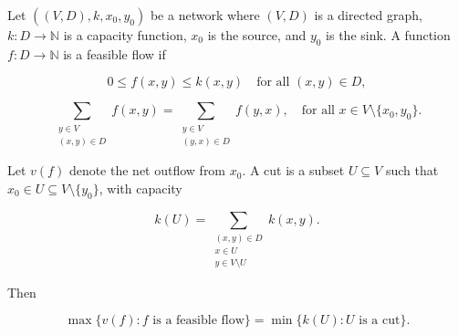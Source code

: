 Let $((V, D), k, x_0, y_0)$ be a network where $(V, D)$ is a directed graph, $k: D \to \mathbb{N}$ is a capacity function, $x_0$ is the source, and $y_0$ is the sink. A function $f: D \to \mathbb{N}$ is a feasible flow if

$$0 \leq f(x, y) \leq k(x, y) \quad \text{for all } (x, y) \in D,$$

$$\sum_{\substack{y \in V \\ (x, y) \in D}} f(x, y) = \sum_{\substack{y \in V \\ (y, x) \in D}} f(y, x), \quad \text{for all } x \in V \setminus \{x_0, y_0\}.$$

Let $v(f)$ denote the net outflow from $x_0$. A cut is a subset $U \subseteq V$ such that $x_0 \in U \subseteq V \setminus \{y_0\}$, with capacity

$$k(U) = \sum_{\substack{(x, y) \in D \\ x \in U \\ y \in V \setminus U}} k(x, y).$$

Then

$$\max\{v(f): f \text{ is a feasible flow}\} = \min\{k(U): U \text{ is a cut}\}.$$
